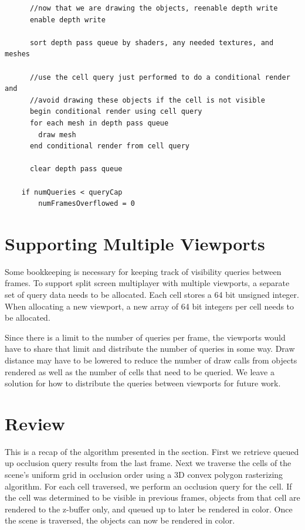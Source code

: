 \documentclass[12pt]{ucthesis}
\begin{document}
\begin{lstlisting}
      //now that we are drawing the objects, reenable depth write
      enable depth write

      sort depth pass queue by shaders, any needed textures, and meshes

      //use the cell query just performed to do a conditional render and
      //avoid drawing these objects if the cell is not visible
      begin conditional render using cell query
      for each mesh in depth pass queue
        draw mesh
      end conditional render from cell query

      clear depth pass queue
      
    if numQueries < queryCap
    	numFramesOverflowed = 0
\end{lstlisting}

\section{Supporting Multiple Viewports}
\label{supporting-multiple-viewports}

Some bookkeeping is necessary for keeping track of visibility queries between frames.
To support split screen multiplayer with multiple viewports, a separate set of query data needs to be allocated.
Each cell stores a 64 bit unsigned integer.
When allocating a new viewport, a new array of 64 bit integers per cell needs to be allocated.

Since there is a limit to the number of queries per frame, the viewports would have to share that limit and distribute the number of queries in some way.
Draw distance may have to be lowered to reduce the number of draw calls from objects rendered as well as the number of cells that need to be queried.
We leave a solution for how to distribute the queries between viewports for future work.

\section{Review}
\label{review}

This is a recap of the algorithm presented in the section.
First we retrieve queued up occlusion query results from the last frame.
Next we traverse the cells of the scene's uniform grid in occlusion order using a 3D convex polygon rasterizing algorithm.
For each cell traversed, we perform an occlusion query for the cell.
If the cell was determined to be visible in previous frames, objects from that cell are rendered to the z-buffer only, and queued up to later be rendered in color.
Once the scene is traversed, the objects can now be rendered in color.
\end{document}
